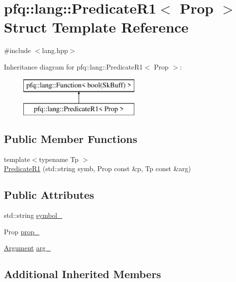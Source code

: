 \hypertarget{structpfq_1_1lang_1_1PredicateR1}{\section{pfq\+:\+:lang\+:\+:Predicate\+R1$<$ Prop $>$ Struct Template Reference}
\label{structpfq_1_1lang_1_1PredicateR1}
}


{\ttfamily \#include $<$lang.\+hpp$>$}

Inheritance diagram for pfq\+:\+:lang\+:\+:Predicate\+R1$<$ Prop $>$\+:\begin{figure}[H]
\begin{center}
\leavevmode
\includegraphics[height=2.000000cm]{structpfq_1_1lang_1_1PredicateR1}
\end{center}
\end{figure}
\subsection*{Public Member Functions}
\begin{DoxyCompactItemize}
\item 
{\footnotesize template$<$typename Tp $>$ }\\\hyperlink{structpfq_1_1lang_1_1PredicateR1_a010aa4b4ba426348e357e05e3cb6371f}{Predicate\+R1} (std\+::string symb, Prop const \&p, Tp const \&arg)
\end{DoxyCompactItemize}
\subsection*{Public Attributes}
\begin{DoxyCompactItemize}
\item 
std\+::string \hyperlink{structpfq_1_1lang_1_1PredicateR1_abdd49bc4fb2fd76c60fefc79339858ec}{symbol\+\_\+}
\item 
Prop \hyperlink{structpfq_1_1lang_1_1PredicateR1_a20938f5576439dbf397db8fd8db122a7}{prop\+\_\+}
\item 
\hyperlink{structpfq_1_1lang_1_1Argument}{Argument} \hyperlink{structpfq_1_1lang_1_1PredicateR1_aa15aa97d87420b99efb16ad6c809d1ca}{arg\+\_\+}
\end{DoxyCompactItemize}
\subsection*{Additional Inherited Members}


